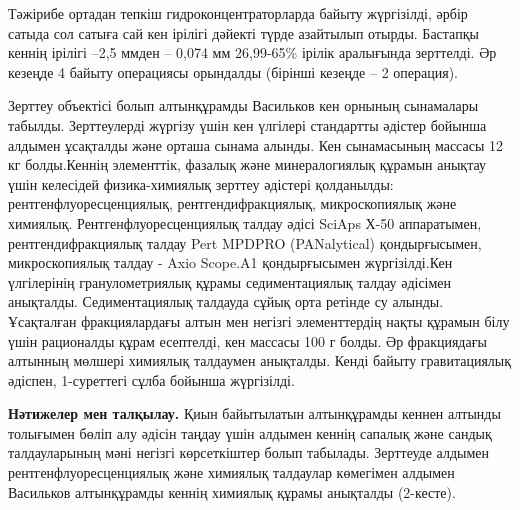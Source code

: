 \begin{multicols}{2}
Тәжірибе ортадан тепкіш гидроконцентраторларда байыту жүргізілді, әрбір
сатыда сол сатыға сай кен ірілігі дәйекті түрде азайтылып отырды.
Бастапқы кеннің ірілігі --2,5 ммден -- 0,074 мм 26,99-65\% ірілік
аралығында зерттелді. Әр кезеңде 4 байыту операциясы орындалды (бірінші
кезеңде -- 2 операция).

Зерттеу объектісі болып алтынқұрамды Васильков кен орнының сынамалары
табылды. Зерттеулерді жүргізу үшін кен үлгілері стандартты әдістер
бойынша алдымен ұсақталды және орташа сынама алынды. Кен сынамасының
массасы 12 кг болды.Кеннің элементтік, фазалық және минералогиялық
құрамын анықтау үшін келесідей физика-химиялық зерттеу әдістері
қолданылды: рентгенфлуоресценциялық, рентгендифракциялық, микроскопиялық
және химиялық. Рентгенфлуоресценциялық талдау әдісі SciAps Х-50
аппаратымен, рентгендифракциялық талдау Pert MPDPRO (PANalytical)
қондырғысымен, микроскопиялық талдау - Axio Scope.A1 қондырғысымен
жүргізілді.Кен үлгілерінің гранулометриялық құрамы седиментациялық
талдау әдісімен анықталды. Седиментациялық талдауда сұйық орта ретінде
су алынды. Ұсақталған фракциялардағы алтын мен негізгі элементтердің
нақты құрамын білу үшін рационалды құрам есептелді, кен массасы 100 г
болды. Әр фракциядағы алтынның мөлшері химиялық талдаумен анықталды.
Кенді байыту гравитациялық әдіспен, 1-суреттегі сұлба бойынша
жүргізілді.

{\bfseries Нәтижелер мен талқылау.} Қиын байытылатын алтынқұрамды кеннен алтынды толығымен бөліп алу әдісін
таңдау үшін алдымен кеннің сапалық және сандық талдауларының мәні
негізгі көрсеткіштер болып табылады. Зерттеуде алдымен
рентгенфлуоресценциялық және химиялық талдаулар көмегімен алдымен
Васильков алтынқұрамды кеннің химиялық құрамы анықталды (2-кесте).
\end{multicols}


